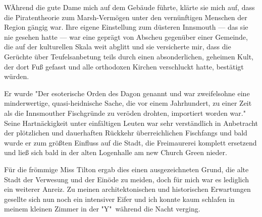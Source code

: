 WÄhrend die gute Dame mich auf dem Gebäude führte, klärte sie mich auf, dass die Piratentheorie zum Marsh-Vermögen unter den vernünftigen Menschen der Region gängig war. Ihre eigene Einstellung zum düsteren Innsmouth --- das sie nie gesehen hatte --- war eine geprägt von Abscheu gegenüber einer Gemeinde, die auf der kulturellen Skala weit abglitt und sie versicherte mir, dass die Gerüchte über Teufelsanbetung teils durch einen absonderlichen, geheimen Kult, der dort Fuß gefasst und alle orthodoxen Kirchen verschluckt hatte, bestätigt würden.

Er wurde "Der esoterische Orden des Dagon genannt und war zweifelsohne eine minderwertige, quasi-heidnische Sache, die vor einem Jahrhundert, zu einer Zeit als die Innsmouther Fischgründe zu veröden drohten, importiert worden war." Seine Hartnäckigkeit unter einfältigen Leuten war sehr verständlich in Anbetracht der plötzlichen und dauerhaften Rückkehr überreichlichen Fischfangs und bald wurde er zum größten Einfluss auf die Stadt, die Freimaurerei komplett ersetzend und ließ sich bald in der alten Logenhalle am new Church Green nieder.

Für die frömmige Miss Tilton ergab dies einen ausgezeichneten Grund, die alte Stadt der Verwesung und der Einöde zu meiden,  doch für mich war es lediglich ein weiterer Anreiz. Zu meinen architektonischen und historischen Erwartungen gesellte sich nun noch ein intensiver Eifer und ich konnte kaum schlafen in meinem kleinen Zimmer in der "Y"\ während die Nacht verging.